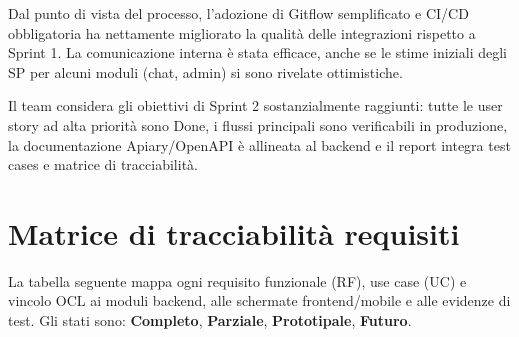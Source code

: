 \documentclass[11pt,a4paper]{article}
\begin{document}
Dal punto di vista del processo, l'adozione di Gitflow semplificato e CI/CD obbligatoria ha nettamente migliorato la qualità delle integrazioni rispetto a Sprint 1. La comunicazione interna è stata efficace, anche se le stime iniziali degli SP per alcuni moduli (chat, admin) si sono rivelate ottimistiche.

Il team considera gli obiettivi di Sprint 2 sostanzialmente raggiunti: tutte le user story ad alta priorità sono Done, i flussi principali sono verificabili in produzione, la documentazione Apiary/OpenAPI è allineata al backend e il report integra test cases e matrice di tracciabilità.

\appendix
\section{Matrice di tracciabilità requisiti}

La tabella seguente mappa ogni requisito funzionale (RF), use case (UC) e vincolo OCL ai moduli backend, alle schermate frontend/mobile e alle evidenze di test. Gli stati sono: \textbf{Completo}, \textbf{Parziale}, \textbf{Prototipale}, \textbf{Futuro}.

\newcommand{\tr}[1]{{\ttfamily\seqsplit{#1}}}
\end{document}
